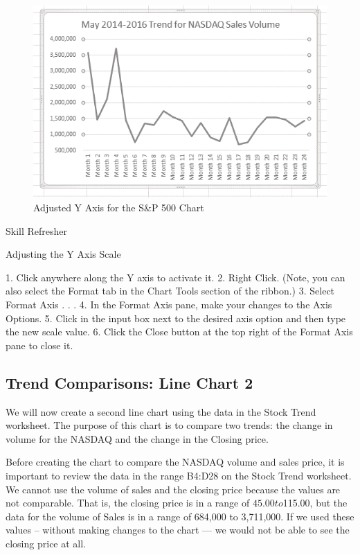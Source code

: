 \begin{figure}[H]
	\centering
	\includegraphics[width=\maxwidth{.95\linewidth}]{gfx/ch04_fig08}
	\caption{Adjusted Y Axis for the S\&P 500 Chart}
	\label{04:fig08}
\end{figure}







Skill Refresher


Adjusting the Y Axis Scale

1. Click anywhere along the Y axis to activate it.
2. Right Click.
(Note, you can also select the Format tab in the Chart Tools section of the ribbon.)
3. Select Format Axis . . .
4. In the Format Axis pane, make your changes to the Axis Options.
5. Click in the input box next to the desired axis option and then type the new scale value.
6. Click the Close button at the top right of the Format Axis pane to close it.



\subsection{Trend Comparisons: Line Chart 2}

We will now create a second line chart using the data in the Stock Trend worksheet. The purpose of
this chart is to compare two trends: the change in volume for the NASDAQ and the change in the
Closing price.

Before creating the chart to compare the NASDAQ volume and sales price, it is important to review
the data in the range B4:D28 on the Stock Trend worksheet. We cannot use the volume of sales and the
closing price because the values are not comparable. That is, the closing price is in a range of $45.00
to $115.00, but the data for the volume of Sales is in a range of 684,000 to 3,711,000. If we used these
values – without making changes to the chart — we would not be able to see the closing price at all.


